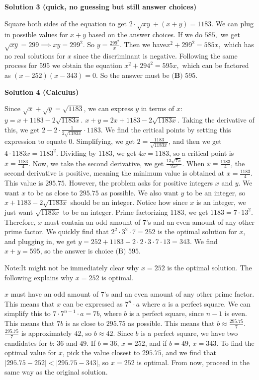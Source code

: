 \begin{enumerate}
 


 



\textbf{Solution 3 (quick, no guessing but still answer choices)}

Square both sides of the equation to get $2\cdot \sqrt{xy} + (x + y) = 1183.$ We can plug in possible values for $x + y$ based on the answer choices. If we do $585,$ we get $\sqrt{xy} = 299 \implies xy = 299^2.$ So $y = \frac{299^2}{x}.$ Then we have$x^2 + 299^2 = 585x,$ which has no real solutions for $x$ since the discriminant is negative. Following the same process for $595$ we obtain the equation $x^2 + 294^2 = 595x,$ which can be factored as $(x - 252)(x - 343) = 0.$ So the answer must be $\boxed{\textbf{(B) }595}$.

 



\textbf{Solution 4 (Calculus)}

Since $\sqrt{x}+\sqrt{y}=\sqrt{1183}$, we can express $y$ in terms of $x$: $y = x+1183-2\sqrt{1183x}$. $x+y = 2x+1183-2\sqrt{1183x}$. Taking the derivative of this, we get $2-2 \cdot \frac{1}{2\sqrt{1183x}} \cdot 1183$. We find the critical points by setting this expression to equate $0$. Simplifying, we get $2 = \frac{1183}{\sqrt{1183x}}$, and then we get $4 \cdot 1183x = 1183^2$. Dividing by $1183$, we get $4x=1183$, so a critical point is $x=\frac{1183}{4}$. Now, we take the second derivative, we get $\frac{13\sqrt{7x}}{2x^2}$. When $x=\frac{1183}{4}$, the second derivative is positive, meaning the minimum value is obtained at $x=\frac{1183}{4}$. This value is $295.75$. However, the problem asks for positive integers $x$ and $y$. We want $x$ to be as close to $295.75$ as possible. We also want $y$ to be an integer, so $x+1183-2\sqrt{1183x}$ should be an integer. Notice how since $x$ is an integer, we just want $\sqrt{1183x}$ to be an integer. Prime factorizing $1183$, we get $1183=7 \cdot 13^2$. Therefore, $x$ must contain an odd amount of $7$'s and an even amount of any other prime factor. We quickly find that $2^2 \cdot 3^2 \cdot 7 = 252$ is the optimal solution for $x$, and plugging in, we get $y=252 + 1183 - 2 \cdot 2 \cdot 3 \cdot 7 \cdot 13 = 343$. We find $x+y=595$, so the answer is choice $\boxed{\text{(B) 595}}$.

 Note:It might not be immediately clear why $x=252$ is the optimal solution. The following explains why $x=252$ is optimal. 

 $x$ must have an odd amount of $7$'s and an even amount of any other prime factor. This means that $x$ can be expressed as $7^n \cdot a$ where $a$ is a perfect square. We can simplify this to $7 \cdot 7^{n-1} \cdot a = 7b$, where $b$ is a perfect square, since $n-1$ is even. This means that $7b$ is as close to $295.75$ as possible. This means that $b \approx \frac{295.75}{7}$. $\frac{295.75}{7}$ is approximately $42$, so $b \approx 42$. Since $b$ is a perfect square, we have two candidates for $b$: $36$ and $49$. If $b=36$, $x=252$, and if $b=49$, $x=343$. To find the optimal value for $x$, pick the value closest to $295.75$, and we find that $\left |295.75-252 \right | < \left |295.75 - 343 \right|$, so $x=252$ is optimal. From now, proceed in the same way as the original solution.


\end{enumerate}
